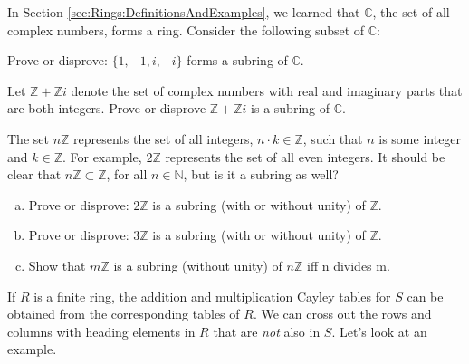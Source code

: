 In Section \ref{sec:Rings:DefinitionsAndExamples}, we learned that ${\mathbb C}$, the set of all complex numbers, forms a ring.  Consider the following subset of ${\mathbb C}$:

\begin{exercise}{}
Prove or disprove:  $\{1,-1,i,-i\}$ forms a subring of ${\mathbb C}$.
\end{exercise}

\begin{exercise}{}
Let ${\mathbb Z}+{\mathbb Z}i$ denote the set of complex numbers with real and imaginary parts that are both integers. Prove or disprove ${\mathbb Z}+{\mathbb Z}i$ is a subring of ${\mathbb C}$.
\end{exercise}

The set $n{\mathbb Z}$ represents the set of all integers, $n\cdot k\in{\mathbb Z}$, such that $n$ is some integer and $k\in{\mathbb Z}$.  For example, $2{\mathbb Z}$ represents the set of all even integers.  It should be clear that $n{\mathbb Z}\subset{\mathbb Z}$, for all $n\in{\mathbb N}$, but is it a subring as well?

\begin{exercise}{}
\begin{enumerate}[(a)]
\item Prove or disprove: $2{\mathbb Z}$ is a subring (with or without unity)  of ${\mathbb Z}$.
\item Prove or disprove: $3{\mathbb Z}$ is a subring (with or without unity)  of ${\mathbb Z}$.
\item Show that $m{\mathbb Z}$ is a subring (without unity) of $n{\mathbb Z}$ iff n divides m.
\end{enumerate}
\end{exercise}

If $R$ is a finite ring, the addition and multiplication Cayley tables for $S$ can be obtained from the corresponding tables of $R$. We can cross out the rows and columns with heading elements in $R$ that are \emph{not} also in $S$. Let's look at an example.

